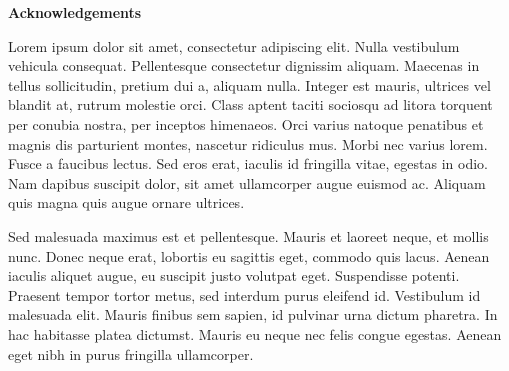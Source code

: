 \cleardoublepage
{}
\setcounter{page}{4}
\pagestyle{plain}

\begin{center}
    {\normalfont\large\bfseries Acknowledgements}
\end{center}

\vspace{2\baselineskip}

\begin{doublespace}
Lorem ipsum dolor sit amet, consectetur adipiscing elit. Nulla vestibulum vehicula consequat. Pellentesque consectetur dignissim aliquam. Maecenas in tellus sollicitudin, pretium dui a, aliquam nulla. Integer est mauris, ultrices vel blandit at, rutrum molestie orci. Class aptent taciti sociosqu ad litora torquent per conubia nostra, per inceptos himenaeos. Orci varius natoque penatibus et magnis dis parturient montes, nascetur ridiculus mus. Morbi nec varius lorem. Fusce a faucibus lectus. Sed eros erat, iaculis id fringilla vitae, egestas in odio. Nam dapibus suscipit dolor, sit amet ullamcorper augue euismod ac. Aliquam quis magna quis augue ornare ultrices.

Sed malesuada maximus est et pellentesque. Mauris et laoreet neque, et mollis nunc. Donec neque erat, lobortis eu sagittis eget, commodo quis lacus. Aenean iaculis aliquet augue, eu suscipit justo volutpat eget. Suspendisse potenti. Praesent tempor tortor metus, sed interdum purus eleifend id. Vestibulum id malesuada elit. Mauris finibus sem sapien, id pulvinar urna dictum pharetra. In hac habitasse platea dictumst. Mauris eu neque nec felis congue egestas. Aenean eget nibh in purus fringilla ullamcorper.
\end{doublespace}

\newpage
